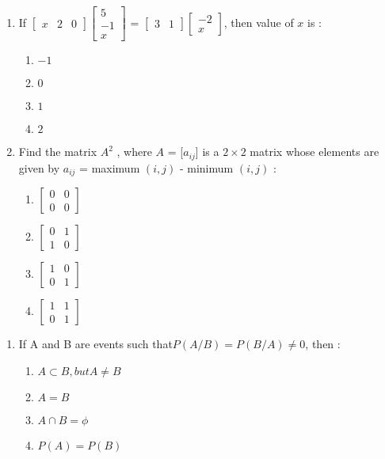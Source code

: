 \documentclass{article}
\providecommand{\myvec}[1]{\ensuremath{\begin{bmatrix}#1\end{bmatrix}}}
\begin{document}
\begin{enumerate}
        \item If $\myvec{x & 2 & 0} \myvec {5 \\ -1 \\ x}$ = $ \myvec{3 & 1} \myvec {-2 \\ x}$, then value of $x$ is :
                \begin{enumerate}[label=(\Alph*)]
                \item $-1$
                        \item $0$
                        \item $1$
                        \item $2$
\end{enumerate}
	\item Find the matrix $A ^{2}$ , where $A$ = [$a_{ij}$] is a $2\times2$ matrix whose elements are given by $a_{ij}$ = maximum $(i,j)$ - minimum $(i,j)$ :
                \begin{enumerate}[label=(\Alph*)]
                \item $\myvec{0 & 0\\0 & 0}$
                        \item $\myvec{0 & 1\\1 & 0}$
                                \item $\myvec{1 & 0 \\0 & 1}$
                                        \item $\myvec{1 & 1\\0 & 1}$
		\end{enumerate}
		\end{enumerate}
				\begin{enumerate}
						\section{PROBABILITY}
\item If A and B are events such that$ P(A/B) = P(B/A) \neq 0$, then
:
                \begin{enumerate}[label=(\Alph*)]
                                                                                                                                                                                 \item $A \subset B, but A \neq B$
                \item $A = B$
                \item $A\cap B = \phi$
                \item $P(A) = P(B)$                                                                                                                                                              \end{enumerate}
				\end{enumerate}
\end{document}
